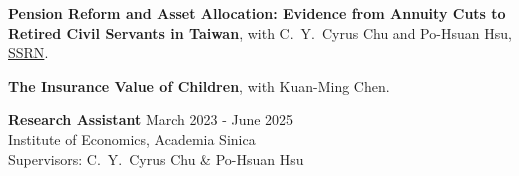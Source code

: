 \documentclass[a4paper, 11pt]{article}
\begin{document}
\vspace{0.2em}


\textbf{Pension Reform and Asset Allocation: Evidence from Annuity Cuts to Retired Civil Servants in Taiwan}, with C.\ Y.\ Cyrus Chu and Po-Hsuan Hsu, \href{https://papers.ssrn.com/sol3/papers.cfm?abstract_id=4856968}{SSRN}.\\ 

\vspace{0.2em}


\textbf{The Insurance Value of Children}, with Kuan-Ming Chen.\\


\vspace{0.2em}

\textbf{Research Assistant} \hfill {March 2023 - June 2025}\\
Institute of Economics, Academia Sinica\\
Supervisors: C.\ Y.\ Cyrus Chu \& Po-Hsuan Hsu

\vspace{0.1em}
\end{document}

